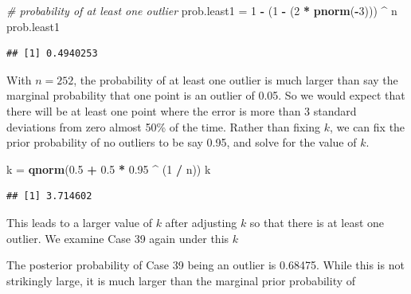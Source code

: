 \documentclass[]{book}
\newenvironment{Shaded}{\begin{snugshade}}{\end{snugshade}}
\newcommand{\KeywordTok}[1]{\textcolor[rgb]{0.13,0.29,0.53}{\textbf{#1}}}
\newcommand{\DecValTok}[1]{\textcolor[rgb]{0.00,0.00,0.81}{#1}}
\newcommand{\FloatTok}[1]{\textcolor[rgb]{0.00,0.00,0.81}{#1}}
\newcommand{\StringTok}[1]{\textcolor[rgb]{0.31,0.60,0.02}{#1}}
\newcommand{\CommentTok}[1]{\textcolor[rgb]{0.56,0.35,0.01}{\textit{#1}}}
\newcommand{\OperatorTok}[1]{\textcolor[rgb]{0.81,0.36,0.00}{\textbf{#1}}}
\newcommand{\NormalTok}[1]{#1}
\theoremstyle{definition}
\theoremstyle{definition}
\theoremstyle{definition}
\theoremstyle{remark}
\begin{document}
\begin{Shaded}
\begin{Highlighting}[]
\CommentTok{# probability of at least one outlier}
\NormalTok{prob.least1 =}\StringTok{ }\DecValTok{1} \OperatorTok{-}\StringTok{ }\NormalTok{(}\DecValTok{1} \OperatorTok{-}\StringTok{ }\NormalTok{(}\DecValTok{2} \OperatorTok{*}\StringTok{ }\KeywordTok{pnorm}\NormalTok{(}\OperatorTok{-}\DecValTok{3}\NormalTok{))) }\OperatorTok{^}\StringTok{ }\NormalTok{n}
\NormalTok{prob.least1}
\end{Highlighting}
\end{Shaded}

\begin{verbatim}
## [1] 0.4940253
\end{verbatim}

With \(n=252\), the probability of at least one outlier is much larger
than say the marginal probability that one point is an outlier of 0.05.
So we would expect that there will be at least one point where the error
is more than 3 standard deviations from zero almost 50\% of the time.
Rather than fixing \(k\), we can fix the prior probability of no
outliers to be say 0.95, and solve for the value of \(k\).

\begin{Shaded}
\begin{Highlighting}[]
\NormalTok{k =}\StringTok{ }\KeywordTok{qnorm}\NormalTok{(}\FloatTok{0.5} \OperatorTok{+}\StringTok{ }\FloatTok{0.5} \OperatorTok{*}\StringTok{ }\FloatTok{0.95} \OperatorTok{^}\StringTok{ }\NormalTok{(}\DecValTok{1} \OperatorTok{/}\StringTok{ }\NormalTok{n))}
\NormalTok{k}
\end{Highlighting}
\end{Shaded}

\begin{verbatim}
## [1] 3.714602
\end{verbatim}

This leads to a larger value of \(k\) after adjusting \(k\) so that
there is at least one outlier. We examine Case 39 again under this \(k\)

\begin{Shaded}
\end{Shaded}

The posterior probability of Case 39 being an outlier is 0.68475. While
this is not strikingly large, it is much larger than the marginal prior
probability of
\end{document}
